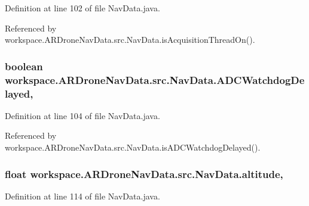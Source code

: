 Definition at line 102 of file Nav\+Data.\+java.



Referenced by workspace.\+A\+R\+Drone\+Nav\+Data.\+src.\+Nav\+Data.\+is\+Acquisition\+Thread\+On().

\hypertarget{classworkspace_1_1_a_r_drone_nav_data_1_1src_1_1_nav_data_a4545435b312a1dc10fc22c46bb9f85f0}{}
\subsubsection[{A\+D\+C\+Watchdog\+Delayed}]{\setlength{\rightskip}{0pt plus 5cm}boolean workspace.\+A\+R\+Drone\+Nav\+Data.\+src.\+Nav\+Data.\+A\+D\+C\+Watchdog\+Delayed\hspace{0.3cm}{\ttfamily [static]}, {\ttfamily [protected]}}\label{classworkspace_1_1_a_r_drone_nav_data_1_1src_1_1_nav_data_a4545435b312a1dc10fc22c46bb9f85f0}


Definition at line 104 of file Nav\+Data.\+java.



Referenced by workspace.\+A\+R\+Drone\+Nav\+Data.\+src.\+Nav\+Data.\+is\+A\+D\+C\+Watchdog\+Delayed().

\hypertarget{classworkspace_1_1_a_r_drone_nav_data_1_1src_1_1_nav_data_a43bdb5aecc5a0cbdb6816096634f60df}{}
\subsubsection[{altitude}]{\setlength{\rightskip}{0pt plus 5cm}float workspace.\+A\+R\+Drone\+Nav\+Data.\+src.\+Nav\+Data.\+altitude\hspace{0.3cm}{\ttfamily [static]}, {\ttfamily [protected]}}\label{classworkspace_1_1_a_r_drone_nav_data_1_1src_1_1_nav_data_a43bdb5aecc5a0cbdb6816096634f60df}


Definition at line 114 of file Nav\+Data.\+java.



